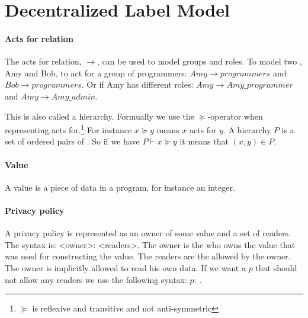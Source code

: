 \section{Decentralized Label Model}
\newcommand{\xvalue}{value}
\newcommand{\xvalues}{values}

\paragraph{Acts for relation}
The acts for relation, $\rightarrow$, can be used to model groups and roles.
To model two \principals{}, Amy and Bob, to act for a group of programmers: $Amy \rightarrow programmers$ and $Bob \rightarrow programmers$.
Or if Amy has different roles: $Amy \rightarrow Amy\_programmer$ and $Amy \rightarrow Amy\_admin$.

This is also called a \principal{} hierarchy.
Formually we use the $\succeq$-operator when representing acts for.\footnote{$\succeq$ is reflexive and transitive and not anti-symmetric}
For instance $x \succeq y$ means $x$ acts for $y$.
A \principal{} hierarchy $P$ is a set of ordered pairs of \principals{}.
So if we have $P \vdash x \succeq y$ it means that $(x,y) \in P$.

\paragraph{Value}
A \xvalue{} is a piece of data in a program, for instance an integer.

\paragraph{Privacy policy}
A privacy policy is represented as an owner of some \xvalue{} and a set of readers.
The syntax is: <owner>: <readers>.
The owner is the \principal{} who owns the \xvalue{} that was used for constructing the \xvalue{}.
The readers are the \principals{} allowed by the owner.
The owner is implicitly allowed to read his own data.
If we want a \principal{} $p$ that should not allow any readers we use the following syntax: $p: \ $.

